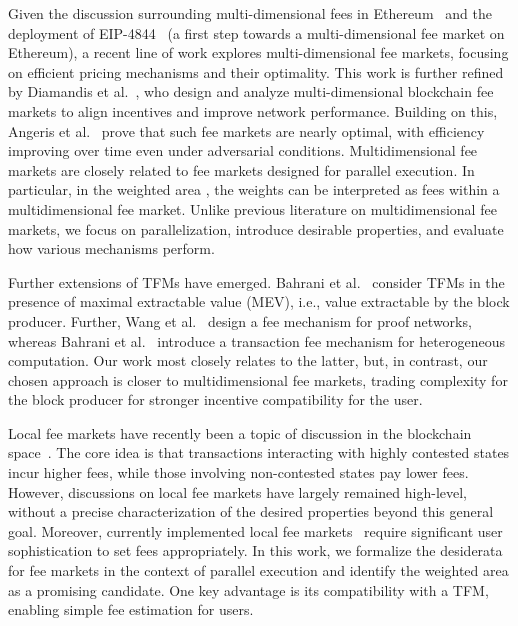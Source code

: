 Given the discussion surrounding multi-dimensional fees in Ethereum~\cite{multidimensional_eip1559,buterin2024multidim} and the deployment of EIP-4844~\cite{eip4844} (a first step towards a multi-dimensional fee market on Ethereum), a recent line of work explores multi-dimensional fee markets, focusing on efficient pricing mechanisms and their optimality. This work is further refined by Diamandis et al.~\cite{diamandis2023designing}, who design and analyze multi-dimensional blockchain fee markets to align incentives and improve network performance. Building on this, Angeris et al.~\cite{angeris2024multidimensional} prove that such fee markets are nearly optimal, with efficiency improving over time even under adversarial conditions. Multidimensional fee markets are closely related to fee markets designed for parallel execution. In particular, in the weighted area \GCM, the weights can be interpreted as fees within a multidimensional fee market. Unlike previous literature on multidimensional fee markets, we focus on parallelization, introduce desirable properties, and evaluate how various mechanisms perform.


Further extensions of TFMs have emerged. Bahrani et al.~\cite{bahrani2024transaction} consider TFMs in the presence of maximal extractable value (MEV), i.e., value extractable by the block producer. Further, Wang et al.~\cite{wang2024mechanism} design a fee mechanism for proof networks, whereas Bahrani et al.~\cite{bahrani2024resonance} introduce a transaction fee mechanism for heterogeneous computation. Our work most closely relates to the latter, but, in contrast, our chosen approach is closer to multidimensional fee markets, trading complexity for the block producer for stronger incentive compatibility for the user.  

Local fee markets have recently been a topic of discussion in the blockchain space~\cite{eclipse2024local,diamandis2024toward,lostin2025truth,keyneom2024local}. The core idea is that transactions interacting with highly contested states incur higher fees, while those involving non-contested states pay lower fees. However, discussions on local fee markets have largely remained high-level, without a precise characterization of the desired properties beyond this general goal. Moreover, currently implemented local fee markets~\cite{lostin2025truth} require significant user sophistication to set fees appropriately. In this work, we formalize the desiderata for fee markets in the context of parallel execution and identify the weighted area \GCM as a promising candidate. One key advantage is its compatibility with a TFM, enabling simple fee estimation for users.


